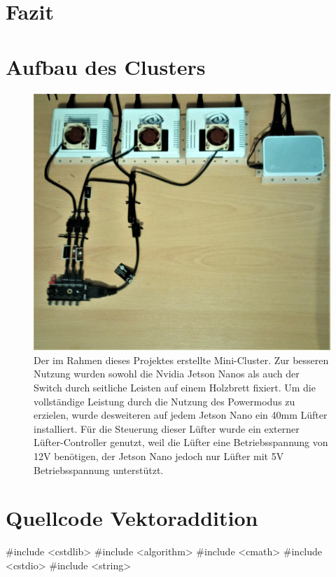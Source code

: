 \documentclass[doktyp=semarbeit, sprache=german]{TUBAFarbeiten}
\begin{document}
\section{Fazit}
\newpage
{} 
\begin{appendix} 
\section{Aufbau des Clusters}
\begin{figure}
	\centering
	\includegraphics[width=1.0\textwidth]{images/Foto1.jpg}
	\caption{Der im Rahmen dieses Projektes erstellte Mini-Cluster. Zur besseren Nutzung wurden sowohl die Nvidia Jetson Nanos als auch der Switch durch seitliche Leisten auf einem Holzbrett fixiert. Um die vollständige Leistung durch die Nutzung des Powermodus zu erzielen, wurde desweiteren auf jedem Jetson Nano ein 40mm Lüfter installiert. Für die Steuerung dieser Lüfter wurde ein externer Lüfter-Controller genutzt, weil die Lüfter eine Betriebsspannung von 12V benötigen, der Jetson Nano jedoch nur Lüfter mit 5V Betriebsspannung unterstützt.}
	\label{img:foto1}
\end{figure}
\newpage
\section{Quellcode Vektoraddition}
\begin{CPP}
#include <cstdlib>
#include <algorithm>
#include <cmath>
#include <cstdio>
#include <string>


\end{CPP}
\end{appendix}
\end{document}
